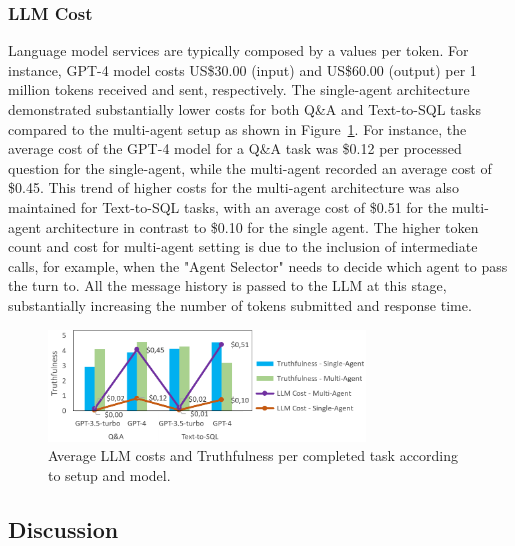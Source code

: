             \subsubsection{LLM Cost} 
                Language model services are typically composed by a values per token. For instance, GPT-4 model costs US\$30.00 (input) and US\$60.00 (output) per 1 million tokens received and sent, respectively.        
                The single-agent architecture demonstrated substantially lower costs for both Q\&A and Text-to-SQL tasks compared to the multi-agent setup as shown in Figure~\ref{fig:truthfulness_vs_cost_vs_config_model}. For instance, the average cost of the GPT-4 model \citep{OpenAI2023} for a Q\&A task was \$0.12 per processed question for the single-agent, while the multi-agent recorded an average cost of \$0.45. This trend of higher costs for the multi-agent architecture was also maintained for Text-to-SQL tasks, with an average cost of \$0.51 for the multi-agent architecture in contrast to \$0.10 for the single agent.
                The higher token count and cost for multi-agent setting is due to the inclusion of intermediate calls, for example, when the "Agent Selector" needs to decide which agent to pass the turn to. All the message history is passed to the LLM at this stage, substantially increasing the number of tokens submitted and response time.


                \begin{figure}[h]
                    \centering              
                        \includegraphics[width=0.75\textwidth]{images/truthfulness_vs_cost_vs_config_model.png}
                    \caption{Average LLM costs and Truthfulness per completed task according to setup and model.}
                    \label{fig:truthfulness_vs_cost_vs_config_model}
                \end{figure}
                
                

        \subsection{Discussion} 
        

